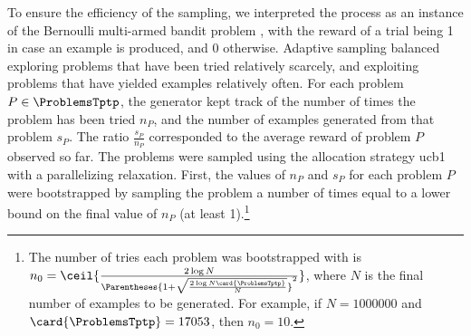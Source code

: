 To ensure the efficiency of the sampling, we interpreted the process as an instance of the Bernoulli multi-armed bandit problem \cite{Sutton1998},
with the reward of a trial being 1 in case an example is produced, and 0 otherwise.
Adaptive sampling balanced
exploring problems that have been tried relatively scarcely, and
exploiting problems that have yielded examples relatively often.
For each problem $P \in \ProblemsTptp$,
the generator kept track of the number of times the problem has been tried $n_P$,
and the number of examples generated from that problem $s_P$.
The ratio $\frac{s_P}{n_P}$ corresponded to the average reward of problem $P$ observed so far.
The problems were sampled using the allocation strategy \acrshort{ucb1} \cite{Auer2002} with a parallelizing relaxation.
First, the values of $n_P$ and $s_P$ for each problem $P$ were bootstrapped by sampling the problem a number of times equal to a lower bound on the final value of $n_P$ (at least 1).\footnote{The number of tries each problem was bootstrapped with is
$n_0 = \ceil{\frac{2 \log{N}}{\Parentheses{1 + \sqrt{\frac{2 \log{N} \card{\ProblemsTptp}}{N}}}^2}}$,
where $N$ is the final number of examples to be generated.
For example, if $N=1000000$ and $\card{\ProblemsTptp}=17053$, then $n_0 = 10$.}
